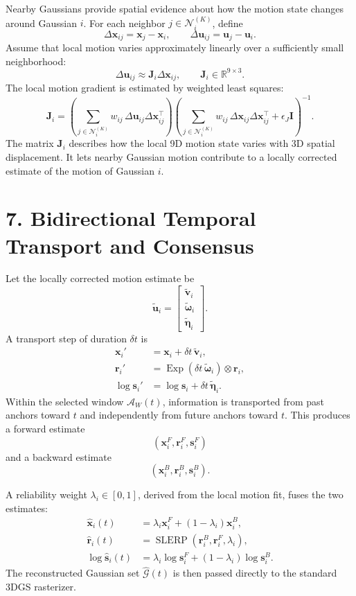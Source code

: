 \documentclass[10pt]{article}
\newcommand{\Win}{\mathcal{A}_{W}(t)}
\newcommand{\NKi}{\mathcal{N}_{i}^{(K)}}
\newcommand{\R}{\mathbb{R}}
\begin{document}
Nearby Gaussians provide spatial evidence about how the motion state changes around Gaussian $i$. For each neighbor $j\in\NKi$, define
\[
\Delta\mathbf{x}_{ij}=\mathbf{x}_j-\mathbf{x}_i,
\qquad
\Delta\mathbf{u}_{ij}=\mathbf{u}_j-\mathbf{u}_i.
\]
Assume that local motion varies approximately linearly over a sufficiently small neighborhood:
\[
\Delta\mathbf{u}_{ij}\approx \mathbf{J}_i\Delta\mathbf{x}_{ij},
\qquad
\mathbf{J}_i\in\R^{9\times3}.
\]
The local motion gradient is estimated by weighted least squares:
\[
\mathbf{J}_i=
\left(
\sum_{j\in\NKi}
 w_{ij}\,\Delta\mathbf{u}_{ij}\Delta\mathbf{x}_{ij}^{\top}
\right)
\left(
\sum_{j\in\NKi}
 w_{ij}\,\Delta\mathbf{x}_{ij}\Delta\mathbf{x}_{ij}^{\top}
+
\epsilon_J\mathbf{I}
\right)^{-1}.
\]
The matrix $\mathbf{J}_i$ describes how the local 9D motion state varies with 3D spatial displacement. It lets nearby Gaussian motion contribute to a locally corrected estimate of the motion of Gaussian $i$.

\section*{7. Bidirectional Temporal Transport and Consensus}

Let the locally corrected motion estimate be
\[
\tilde{\mathbf{u}}_i=
\begin{bmatrix}
\tilde{\mathbf{v}}_i\\
\tilde{\boldsymbol{\omega}}_i\\
\tilde{\boldsymbol{\eta}}_i
\end{bmatrix}.
\]
A transport step of duration $\delta t$ is
\begin{align}
\mathbf{x}_i' &= \mathbf{x}_i+\delta t\,\tilde{\mathbf{v}}_i,\\
\mathbf{r}_i' &= \operatorname{Exp}(\delta t\,\tilde{\boldsymbol{\omega}}_i)\otimes\mathbf{r}_i,\\
\log\mathbf{s}_i' &= \log\mathbf{s}_i+\delta t\,\tilde{\boldsymbol{\eta}}_i.
\end{align}
Within the selected window $\Win$, information is transported from past anchors toward $t$ and independently from future anchors toward $t$. This produces a forward estimate
\[
(\mathbf{x}_i^F,\mathbf{r}_i^F,\mathbf{s}_i^F)
\]
and a backward estimate
\[
(\mathbf{x}_i^B,\mathbf{r}_i^B,\mathbf{s}_i^B).
\]

A reliability weight $\lambda_i\in[0,1]$, derived from the local motion fit, fuses the two estimates:
\begin{align}
\hat{\mathbf{x}}_i(t)
&=\lambda_i\mathbf{x}_i^F+(1-\lambda_i)\mathbf{x}_i^B,\\
\hat{\mathbf{r}}_i(t)
&=\operatorname{SLERP}\!\left(\mathbf{r}_i^B,\mathbf{r}_i^F,\lambda_i\right),\\
\log\hat{\mathbf{s}}_i(t)
&=\lambda_i\log\mathbf{s}_i^F+(1-\lambda_i)\log\mathbf{s}_i^B.
\end{align}
The reconstructed Gaussian set $\hat{\mathcal{G}}(t)$ is then passed directly to the standard 3DGS rasterizer.
\end{document}

